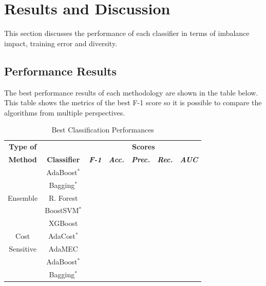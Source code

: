 \documentclass[conference]{IEEEtran}
\begin{document}
\section{Results and Discussion}
This section discusses the performance of each classifier in terms of imbalance impact, training error and diversity.

\subsection{Performance Results}

The best performance results of each methodology are shown in the table below. This table shows the metrics of the best F-1 score so it is possible to compare the algorithms from multiple perspectives.

\begin{table}[htbp]
\caption{Best Classification Performances}

\begin{center}

\begin{tabular}{|c|c|c|c|c|c|c|}

\hline
\textbf{Type of} & & \multicolumn{5}{|c|}{\textbf{Scores}} \\
\cline{3-7} 

\textbf{Method} & \textbf{Classifier} &\textbf{\textit{F-1}}& \textbf{\textit{Acc.}}&\textbf{\textit{Prec.}}&\textbf{\textit{Rec.}}&\textbf{\textit{AUC}}\\
\hline

& AdaBoost$^*$ & & & & &  \\
\cline{2-7} 

& Bagging$^*$ & & & & &  \\
\cline{2-7} 

Ensemble & R. Forest & & & & &  \\
\cline{2-7} 

& BoostSVM$^*$ & & & & &  \\
\cline{2-7} 

& XGBoost & & & & &  \\
\hline

Cost & AdaCost$^*$ & & & & &  \\
\cline{2-7} 

Sensitive& AdaMEC & & & & &  \\
\hline

& AdaBoost$^*$ & & & & &  \\
\cline{2-7} 

& Bagging$^*$ & & & & &  \\
\cline{2-7} 


\end{tabular}
\end{center}
\end{table}
\end{document}
